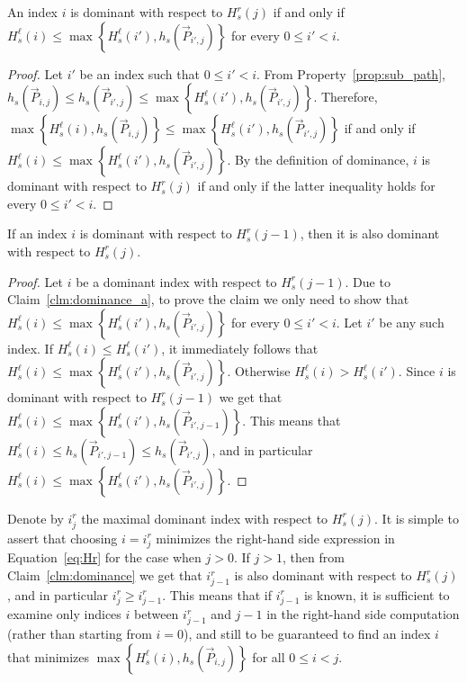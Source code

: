 \begin{claim}
	\label{clm:dominance_a}
	An index $i$ is dominant with respect to $H^r_s(j)$ if and only if $H^\ell_s(i) \leq \max\left\{H^\ell_s(i'), h_s(\vec{P}_{i', j})\right\}$ for every $0 \leq i' < i$.
\end{claim}

\begin{proof}
	Let $i'$ be an index such that $0 \leq i' < i$.
	From Property~\ref{prop:sub_path}, $h_s(\vec{P}_{i, j}) \leq h_s(\vec{P}_{i', j}) \leq \max\left\{H^\ell_s(i'), h_s(\vec{P}_{i', j})\right\}$. Therefore, $\max\left\{H^\ell_s(i), h_s(\vec{P}_{i, j})\right\} \leq \max\left\{H^\ell_s(i'), h_s(\vec{P}_{i', j})\right\}$ if and only if $H^\ell_s(i) \leq \max\left\{H^\ell_s(i'), h_s(\vec{P}_{i', j})\right\}$. By the definition of dominance, $i$ is dominant with respect to $H^r_s(j)$ if and only if the latter inequality holds for every $0 \leq i' < i$.
\end{proof}


\begin{claim}
	\label{clm:dominance}
	If an index $i$ is dominant with respect to $H^r_s(j-1)$, then it is also dominant with respect to  $H^r_s(j)$.
\end{claim}

\begin{proof}
	Let $i$ be a dominant index with respect to $H^r_s(j-1)$. Due to Claim~\ref{clm:dominance_a}, to prove the claim we only need to show that $H^\ell_s(i) \leq \max\left\{H^\ell_s(i'), h_s(\vec{P}_{i', j})\right\}$ for every $0 \leq i' < i$.
	Let $i'$ be any such index.
	If $H^\ell_s(i) \leq H^\ell_s(i')$, it immediately follows that $H^\ell_s(i) \leq \max\left\{H^\ell_s(i'), h_s(\vec{P}_{i', j})\right\}$.
	Otherwise  $H^\ell_s(i) > H^\ell_s(i')$. Since $i$ is dominant with respect to $H^r_s(j-1)$ we get that $H^\ell_s(i) \leq \max\left\{H^\ell_s(i'), h_s(\vec{P}_{i', j-1})\right\}$. This means that $H^\ell_s(i) \leq h_s(\vec{P}_{i', j-1}) \leq h_s(\vec{P}_{i', j})$, and in particular $H^\ell_s(i) \leq \max\left\{H^\ell_s(i'), h_s(\vec{P}_{i', j})\right\}$.
\end{proof}

Denote by $i^r_j$ the maximal dominant index with respect to $H^r_s(j)$. It is simple to assert that choosing $i = i^r_j$ minimizes the right-hand side expression in Equation~\ref{eq:Hr} for the case when $j > 0$. If $j > 1$, then from Claim~\ref{clm:dominance} we get that $i^r_{j-1}$ is also dominant with respect to $H^r_s(j)$, and in particular $i^r_j \geq i^r_{j-1}$. This means that if $i^r_{j-1}$ is known, it is sufficient to examine only indices $i$ between $i^r_{j-1}$ and $j-1$ in the right-hand side computation (rather than starting from $i=0$), and still to be guaranteed to find an index $i$ that minimizes $\max\left\{H^\ell_s(i), h_s(\vec{P}_{i, j})\right\}$ for all $0 \leq i < j$.


